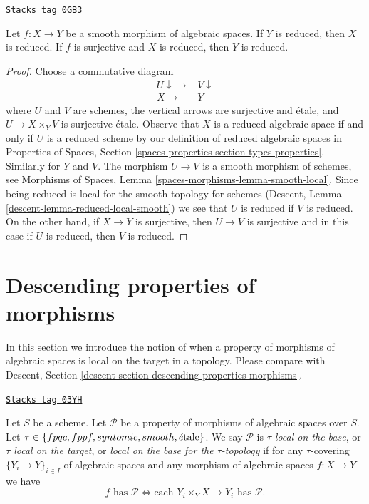\begin{lemma}
\label{spaces-descent-lemma-reduced-local-smooth}
\href{https://stacks.math.columbia.edu/tag/0GB3}{\texttt{Stacks tag 0GB3}}

Let $f : X \to Y$ be a smooth morphism of algebraic spaces.
If $Y$ is reduced, then $X$ is reduced. If $f$ is surjective
and $X$ is reduced, then $Y$ is reduced.
\end{lemma}

\begin{proof}
Choose a commutative diagram
$$
\begin{array}{cc}U \downarrow\longrightarrow & V \downarrow \\ X \longrightarrow & Y\end{array}
$$
where $U$ and $V$ are schemes, the vertical arrows are surjective and
\'etale, and $U \to X \times_Y V$ is surjective \'etale. Observe that $X$ is
a reduced algebraic space if and only if $U$ is a reduced scheme
by our definition of reduced algebraic spaces in
Properties of Spaces, Section \ref{spaces-properties-section-types-properties}.
Similarly for $Y$ and $V$.
The morphism $U \to V$ is a smooth morphism of schemes, see
Morphisms of Spaces, Lemma \ref{spaces-morphisms-lemma-smooth-local}.
Since being reduced is local for the smooth topology for
schemes (Descent, Lemma \ref{descent-lemma-reduced-local-smooth})
we see that $U$ is reduced if $V$ is reduced.
On the other hand, if $X \to Y$ is surjective, then $U \to V$ is
surjective and in this case if $U$ is reduced, then $V$ is reduced.
\end{proof}

\section{Descending properties of morphisms}
\label{spaces-descent-section-descending-properties-morphisms}
In this section we introduce the notion of when a property of morphisms of
algebraic spaces is local on the target in a topology. Please compare with
Descent, Section \ref{descent-section-descending-properties-morphisms}.

\begin{definition}
\label{spaces-descent-definition-property-morphisms-local}
\href{https://stacks.math.columbia.edu/tag/03YH}{\texttt{Stacks tag 03YH}}

Let $S$ be a scheme.
Let $\mathcal{P}$ be a property of morphisms of algebraic spaces over $S$.
Let $\tau \in \{fpqc, fppf, syntomic, smooth, \acute{e}\text{tale}\}$.
We say $\mathcal{P}$ is {\it $\tau$ local on the base}, or
{\it $\tau$ local on the target}, or
{\it local on the base for the $\tau$-topology} if for any
$\tau$-covering $\{Y_i \to Y\}_{i \in I}$ of algebraic spaces
and any morphism of algebraic spaces $f : X \to Y$ we
have
$$
f \text{ has }\mathcal{P}
\Leftrightarrow
\text{each }Y_i \times_Y X \to Y_i\text{ has }\mathcal{P}.
$$
\end{definition}

